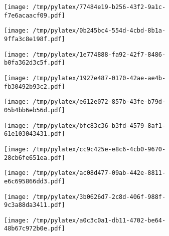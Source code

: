 \documentclass{article}
\begin{document}
\begin{figure}[htbp]
\begin{subfigure}[b]{.3\linewidth}
\texttt{[image: /tmp/pylatex/77484e19-b256-43f2-9a1c-f7e6acaacf09.pdf]}
\end{subfigure}
\begin{subfigure}[b]{.3\linewidth}
\texttt{[image: /tmp/pylatex/0b245bc4-554d-4cbd-8b1a-9ffa3c8e198f.pdf]}
\end{subfigure}
\begin{subfigure}[b]{.3\linewidth}
\texttt{[image: /tmp/pylatex/1e774888-fa92-42f7-8486-b0fa362d3c5f.pdf]}
\end{subfigure}
\begin{subfigure}[b]{.3\linewidth}
\texttt{[image: /tmp/pylatex/1927e487-0170-42ae-ae4b-fb30492b93c2.pdf]}
\end{subfigure}
\begin{subfigure}[b]{.3\linewidth}
\texttt{[image: /tmp/pylatex/e612e072-857b-43fe-b79d-05b4bb6eb56d.pdf]}
\end{subfigure}
\begin{subfigure}[b]{.3\linewidth}
\texttt{[image: /tmp/pylatex/bfc83c36-b3fd-4579-8af1-61e103043431.pdf]}
\end{subfigure}
\begin{subfigure}[b]{.3\linewidth}
\texttt{[image: /tmp/pylatex/cc9c425e-e8c6-4cb0-9670-28cb6fe651ea.pdf]}
\end{subfigure}
\begin{subfigure}[b]{.3\linewidth}
\texttt{[image: /tmp/pylatex/ac08d477-09ab-442e-8811-e6c695866dd3.pdf]}
\end{subfigure}
\begin{subfigure}[b]{.3\linewidth}
\texttt{[image: /tmp/pylatex/3b0626d7-2c8d-406f-988f-9c3a88da3411.pdf]}
\end{subfigure}
\begin{subfigure}[b]{.3\linewidth}
\texttt{[image: /tmp/pylatex/a0c3c0a1-db11-4702-be64-48b67c972b0e.pdf]}
\end{subfigure}
\end{figure}
\end{document}
